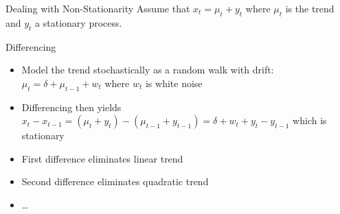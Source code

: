 \documentclass[ignorenonframetext,xcolor=x11names]{beamer}
\begin{document}


\begin{frame}{Dealing with Non-Stationarity}
Assume that $x_t = \mu_t + y_t$ where $\mu_t$ is the trend and $y_t$ a stationary process.
\begin{block}{Differencing}
\begin{itemize}
  \item Model the trend stochastically as a random walk with drift: $\mu_t = \delta + \mu_{t-1} + w_t$ where $w_t$ is white noise
  \item Differencing then yields $x_t - x_{t-1} = (\mu_t + y_t) - (\mu_{t-1} + y_{t-1}) = \delta + w_t + y_t - y_{t-1}$ which is stationary
\end{itemize}
\end{block}
\begin{itemize}
  \item First difference eliminates linear trend
  \item Second difference eliminates quadratic trend
  \item \ldots
\end{itemize}
\end{frame}
\end{document}
